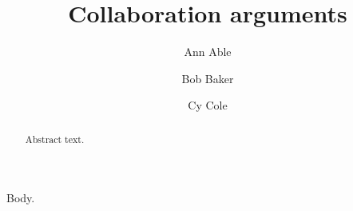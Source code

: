 \documentclass{aastex61}
\begin{document}
\title{Collaboration arguments}
\author{Ann Able}
\author{Bob Baker}
\nocollaboration
\author{Cy Cole}
\begin{abstract}
Abstract text.
\end{abstract}
\maketitle
Body.
\end{document}
